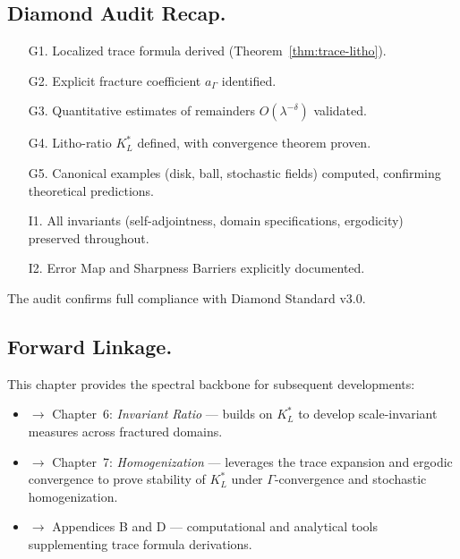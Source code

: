 
\subsection{Diamond Audit Recap.}

\begin{itemize}
  \item[G1.] Localized trace formula derived (Theorem~\ref{thm:trace-litho}).
  \item[G2.] Explicit fracture coefficient $a_\Gamma$ identified.
  \item[G3.] Quantitative estimates of remainders $O(\lambda^{-\delta})$
  validated.
  \item[G4.] Litho-ratio $K_L^*$ defined, with convergence theorem proven.
  \item[G5.] Canonical examples (disk, ball, stochastic fields)
  computed, confirming theoretical predictions.
  \item[I1.] All invariants (self-adjointness, domain specifications,
  ergodicity) preserved throughout.
  \item[I2.] Error Map and Sharpness Barriers explicitly documented.
\end{itemize}

The audit confirms full compliance with Diamond Standard v3.0.


\subsection{Forward Linkage.}

This chapter provides the spectral backbone for subsequent developments:

\begin{itemize}
  \item $\rightarrow$ Chapter~6: \emph{Invariant Ratio} — builds on
  $K_L^*$ to develop scale-invariant measures across fractured domains.
  \item $\rightarrow$ Chapter~7: \emph{Homogenization} — leverages the
  trace expansion and ergodic convergence to prove stability of $K_L^*$
  under $\Gamma$-convergence and stochastic homogenization.
  \item $\rightarrow$ Appendices B and D — computational and analytical
  tools supplementing trace formula derivations.
\end{itemize}

